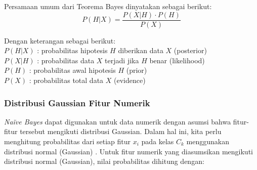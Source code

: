 Persamaan umum dari Teorema Bayes dinyatakan sebagai berikut:
\begin{equation}
	P(H|X) = \frac{P(X|H) \cdot P(H)}{P(X)}
	\label{eq:bayes}
\end{equation}

\vspace{0.5em}

\noindent
Dengan keterangan sebagai berikut:\\[0.5em]
\hspace*{1.5em}$P(H|X)$ : probabilitas hipotesis $H$ diberikan data $X$ (posterior)\\
\hspace*{1.5em}$P(X|H)$ : probabilitas data $X$ terjadi jika $H$ benar (likelihood)\\
\hspace*{1.5em}$P(H)$ \hspace{0.65em}: probabilitas awal hipotesis $H$ (prior)\\
\hspace*{1.5em}$P(X)$ \hspace{0.65em}: probabilitas total data $X$ (evidence)





\subsubsection{Distribusi Gaussian Fitur Numerik}\label{II.Distribusi Gaussian Fitur Numerik}
\textit{Naïve Bayes} dapat digunakan untuk data numerik dengan asumsi bahwa fitur-fitur tersebut mengikuti distribusi Gaussian. Dalam hal ini, kita perlu menghitung probabilitas dari setiap fitur $x_i$ pada kelas $C_k$ menggunakan distribusi normal (Gaussian) \cite{Riza2025KlasifikasiVK}.
Untuk fitur numerik yang diasumsikan mengikuti distribusi normal (Gaussian), nilai probabilitas dihitung dengan:

